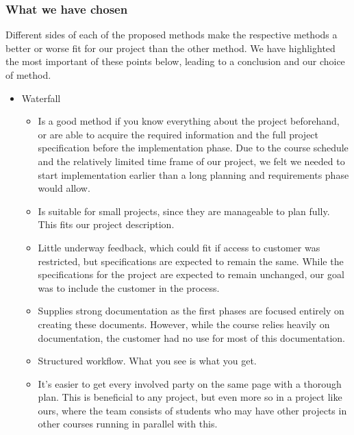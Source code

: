 \subsubsection{What we have chosen}
Different sides of each of the proposed methods make the respective methods a better or worse fit for our project than the other method. We have highlighted the most important of these points below, leading to a conclusion and our choice of method.
\begin{itemize}
	\item Waterfall
	\begin{itemize}
		\item Is a good method if you know everything about the project beforehand, or are able to acquire the required information and the full project specification before the implementation phase. Due to the course schedule and the relatively limited time frame of our project, we felt we needed to start implementation earlier than a long planning and requirements phase would allow.
		\item Is suitable for small projects, since they are manageable to plan fully. This fits our project description.
		\item Little underway feedback, which could fit if access to customer was restricted, but specifications are expected to remain the same. While the specifications for the project are expected to remain unchanged, our goal was to include the customer in the process.
		\item Supplies strong documentation as the first phases are focused entirely on creating these documents. However, while the course relies heavily on documentation, the customer had no use for most of this documentation.
		\item Structured workflow. What you see is what you get.
		\item It's easier to get every involved party on the same page with a thorough plan. This is beneficial to any project, but even more so in a project like ours, where the team consists of students who may have other projects in other courses running in parallel with this.
	\end{itemize}
\end{itemize}
